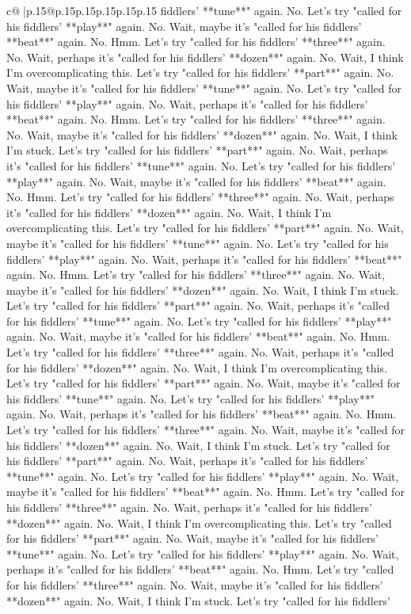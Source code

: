 \documentclass{article}
\begin{document}
{\begin{supertabular}{c@{$\;$}|p{.15\linewidth}@{}p{.15\linewidth}p{.15\linewidth}p{.15\linewidth}p{.15\linewidth}p{.15\linewidth}}
{{{fiddlers' **tune**" again. No. Let's try "called for his fiddlers' **play**" again. No. Wait, maybe it's "called for his fiddlers' **beat**" again. No. Hmm. Let's try "called for his fiddlers' **three**" again. No. Wait, perhaps it's "called for his fiddlers' **dozen**" again. No. Wait, I think I'm overcomplicating this. Let's try "called for his fiddlers' **part**" again. No. Wait, maybe it's "called for his fiddlers' **tune**" again. No. Let's try "called for his fiddlers' **play**" again. No. Wait, perhaps it's "called for his fiddlers' **beat**" again. No. Hmm. Let's try "called for his fiddlers' **three**" again. No. Wait, maybe it's "called for his fiddlers' **dozen**" again. No. Wait, I think I'm stuck. Let's try "called for his fiddlers' **part**" again. No. Wait, perhaps it's "called for his fiddlers' **tune**" again. No. Let's try "called for his fiddlers' **play**" again. No. Wait, maybe it's "called for his fiddlers' **beat**" again. No. Hmm. Let's try "called for his fiddlers' **three**" again. No. Wait, perhaps it's "called for his fiddlers' **dozen**" again. No. Wait, I think I'm overcomplicating this. Let's try "called for his fiddlers' **part**" again. No. Wait, maybe it's "called for his fiddlers' **tune**" again. No. Let's try "called for his fiddlers' **play**" again. No. Wait, perhaps it's "called for his fiddlers' **beat**" again. No. Hmm. Let's try "called for his fiddlers' **three**" again. No. Wait, maybe it's "called for his fiddlers' **dozen**" again. No. Wait, I think I'm stuck. Let's try "called for his fiddlers' **part**" again. No. Wait, perhaps it's "called for his fiddlers' **tune**" again. No. Let's try "called for his fiddlers' **play**" again. No. Wait, maybe it's "called for his fiddlers' **beat**" again. No. Hmm. Let's try "called for his fiddlers' **three**" again. No. Wait, perhaps it's "called for his fiddlers' **dozen**" again. No. Wait, I think I'm overcomplicating this. Let's try "called for his fiddlers' **part**" again. No. Wait, maybe it's "called for his fiddlers' **tune**" again. No. Let's try "called for his fiddlers' **play**" again. No. Wait, perhaps it's "called for his fiddlers' **beat**" again. No. Hmm. Let's try "called for his fiddlers' **three**" again. No. Wait, maybe it's "called for his fiddlers' **dozen**" again. No. Wait, I think I'm stuck. Let's try "called for his fiddlers' **part**" again. No. Wait, perhaps it's "called for his fiddlers' **tune**" again. No. Let's try "called for his fiddlers' **play**" again. No. Wait, maybe it's "called for his fiddlers' **beat**" again. No. Hmm. Let's try "called for his fiddlers' **three**" again. No. Wait, perhaps it's "called for his fiddlers' **dozen**" again. No. Wait, I think I'm overcomplicating this. Let's try "called for his fiddlers' **part**" again. No. Wait, maybe it's "called for his fiddlers' **tune**" again. No. Let's try "called for his fiddlers' **play**" again. No. Wait, perhaps it's "called for his fiddlers' **beat**" again. No. Hmm. Let's try "called for his fiddlers' **three**" again. No. Wait, maybe it's "called for his fiddlers' **dozen**" again. No. Wait, I think I'm stuck. Let's try "called for his fiddlers' }}}
\end{supertabular}}
\end{document}
